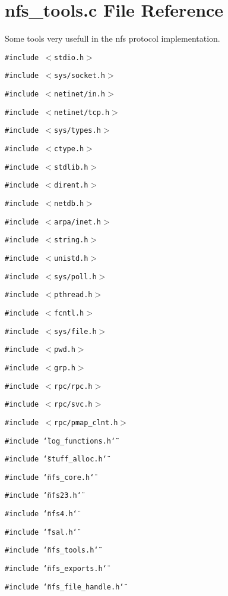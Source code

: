 \section{nfs\_\-tools.c File Reference}
\label{nfs__tools_8c}
Some tools very usefull in the nfs protocol implementation. 

{\tt \#include $<$stdio.h$>$}\par
{\tt \#include $<$sys/socket.h$>$}\par
{\tt \#include $<$netinet/in.h$>$}\par
{\tt \#include $<$netinet/tcp.h$>$}\par
{\tt \#include $<$sys/types.h$>$}\par
{\tt \#include $<$ctype.h$>$}\par
{\tt \#include $<$stdlib.h$>$}\par
{\tt \#include $<$dirent.h$>$}\par
{\tt \#include $<$netdb.h$>$}\par
{\tt \#include $<$arpa/inet.h$>$}\par
{\tt \#include $<$string.h$>$}\par
{\tt \#include $<$unistd.h$>$}\par
{\tt \#include $<$sys/poll.h$>$}\par
{\tt \#include $<$pthread.h$>$}\par
{\tt \#include $<$fcntl.h$>$}\par
{\tt \#include $<$sys/file.h$>$}\par
{\tt \#include $<$pwd.h$>$}\par
{\tt \#include $<$grp.h$>$}\par
{\tt \#include $<$rpc/rpc.h$>$}\par
{\tt \#include $<$rpc/svc.h$>$}\par
{\tt \#include $<$rpc/pmap\_\-clnt.h$>$}\par
{\tt \#include \char`\"{}log\_\-functions.h\char`\"{}}\par
{\tt \#include \char`\"{}stuff\_\-alloc.h\char`\"{}}\par
{\tt \#include \char`\"{}nfs\_\-core.h\char`\"{}}\par
{\tt \#include \char`\"{}nfs23.h\char`\"{}}\par
{\tt \#include \char`\"{}nfs4.h\char`\"{}}\par
{\tt \#include \char`\"{}fsal.h\char`\"{}}\par
{\tt \#include \char`\"{}nfs\_\-tools.h\char`\"{}}\par
{\tt \#include \char`\"{}nfs\_\-exports.h\char`\"{}}\par
{\tt \#include \char`\"{}nfs\_\-file\_\-handle.h\char`\"{}}\par
